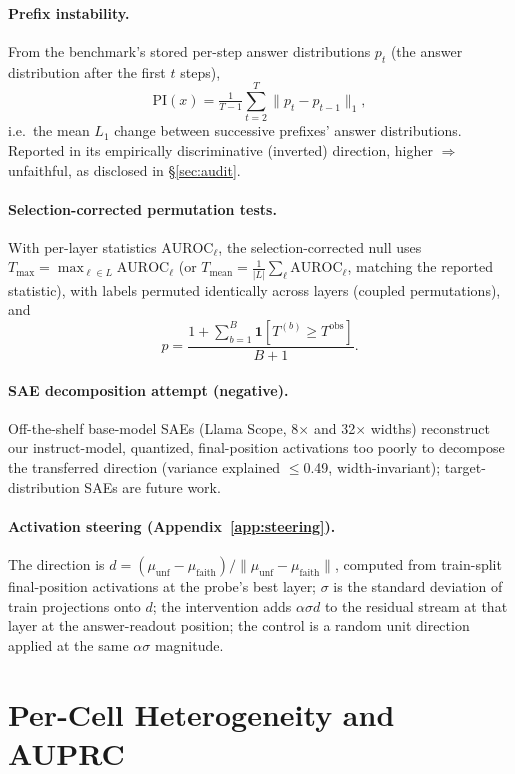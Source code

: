 \documentclass[11pt]{article}
\begin{document}
\paragraph{Prefix instability.} From the benchmark's stored per-step answer distributions $p_t$ (the answer distribution after the first $t$ steps),
\[ \mathrm{PI}(x) = \tfrac{1}{T-1}\textstyle\sum_{t=2}^{T} \lVert p_t - p_{t-1}\rVert_1 , \]
i.e.\ the mean $L_1$ change between successive prefixes' answer distributions. Reported in its empirically discriminative (inverted) direction, higher $\Rightarrow$ unfaithful, as disclosed in \S\ref{sec:audit}.

\paragraph{Selection-corrected permutation tests.} With per-layer statistics $\mathrm{AUROC}_\ell$, the selection-corrected null uses $T_{\max} = \max_{\ell\in L}\mathrm{AUROC}_\ell$ (or $T_{\mathrm{mean}} = \tfrac{1}{\lvert L\rvert}\sum_\ell \mathrm{AUROC}_\ell$, matching the reported statistic), with labels permuted identically across layers (coupled permutations), and
\[ p = \frac{1 + \sum_{b=1}^{B} \mathbf{1}\!\left[T^{(b)} \ge T^{\mathrm{obs}}\right]}{B + 1}. \]

\paragraph{SAE decomposition attempt (negative).} Off-the-shelf base-model SAEs (Llama Scope, 8$\times$ and 32$\times$ widths) reconstruct our instruct-model, quantized, final-position activations too poorly to decompose the transferred direction (variance explained $\leq$0.49, width-invariant); target-distribution SAEs are future work.

\paragraph{Activation steering (Appendix~\ref{app:steering}).} The direction is $d = (\mu_{\mathrm{unf}} - \mu_{\mathrm{faith}})/\lVert\mu_{\mathrm{unf}} - \mu_{\mathrm{faith}}\rVert$, computed from train-split final-position activations at the probe's best layer; $\sigma$ is the standard deviation of train projections onto $d$; the intervention adds $\alpha\sigma d$ to the residual stream at that layer at the answer-readout position; the control is a random unit direction applied at the same $\alpha\sigma$ magnitude.

\section{Per-Cell Heterogeneity and AUPRC}
\label{app:forest}
\end{document}
